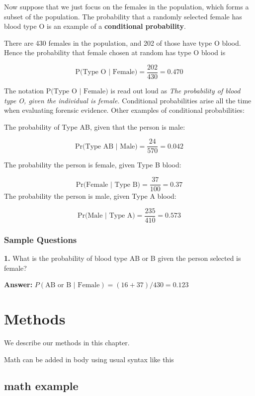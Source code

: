 \documentclass[
]{book}
\begin{document}
Now suppose that we just focus on the females in the population, which
forms a subset of the population. The probability that a randomly selected
female has blood type O is an example of a \textbf{conditional probability}.

There are 430 females in the population, and 202 of those have type O blood.\\
Hence the probability that female chosen at random has type O blood is

\[
\mbox{P(Type O | Female)} = \frac{202}{430} = 0.470
\]

The notation \(\mbox{P(Type O | Female)}\) is read out loud as
\emph{The probability of blood type O, given the individual is female.}
Conditional probabilities arise all the time when evaluating forensic evidence.
Other examples of conditional probabilities:

The probability of Type AB, given that the person is male:

\[
\mbox{Pr(Type AB | Male)} = \frac{24}{570} = 0.042
\]

The probability the person is female, given Type B blood:

\[
\mbox{Pr(Female | Type B)} = \frac{37}{100} = 0.37
\]
The probability the person is male, given Type A blood:

\[
\mbox{Pr(Male | Type A)} = \frac{235}{410} = 0.573
\]

\hypertarget{sample-questions-2}{%
\subsection{Sample Questions}\label{sample-questions-2}}

\textbf{1.} What is the probability of blood type AB or B given the person selected is female?

\textbf{Answer:} \(P(\text{AB or B | Female}) = (16 + 37) / 430 = 0.123\)

\hypertarget{methods}{%
\chapter{Methods}\label{methods}}

We describe our methods in this chapter.

Math can be added in body using usual syntax like this

\hypertarget{math-example}{%
\section{math example}\label{math-example}}
\end{document}
